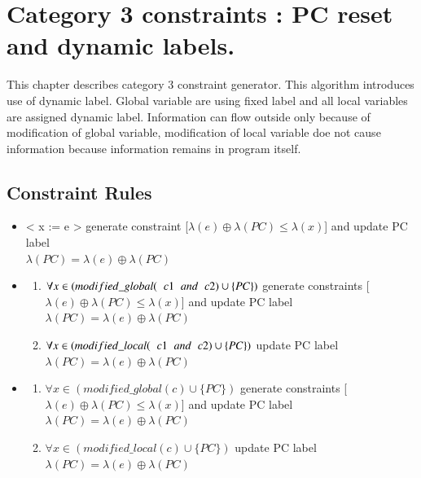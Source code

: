 \section{Category 3 constraints : PC reset and dynamic labels.}
\label{ch:c3}
This chapter describes category 3 constraint generator. This algorithm introduces use of dynamic label. Global variable are using fixed label and all local variables are assigned dynamic label. Information can flow outside only because of modification of global variable, modification of local variable doe not cause information because information remains in program itself.   
\subsection{Constraint Rules}
\begin{itemize}
	\item < x := e > generate constraint [$\lambda(e)\oplus\lambda(PC)\le\lambda(x)$] and update PC label\\ $\lambda(PC) = \lambda(e)\oplus\lambda(PC)$ 
	\item < if e then c1 else c2> \begin{enumerate}
		\item $\forall  x \in ( modified\_global(\hspace{0.2cm} c1 \hspace{0.2cm}and \hspace{0.2cm} c2) \cup \{PC\} )$ generate constraints [$\lambda(e)\oplus\lambda(PC)\le\lambda(x)$] and update PC label $\lambda(PC) = \lambda(e)\oplus\lambda(PC)$
		\item $\forall x \in ( modified\_local(\hspace{0.2cm} c1 \hspace{0.2cm}and \hspace{0.2cm} c2) \cup \{PC\} )$ update PC label $\lambda(PC) = \lambda(e)\oplus\lambda(PC)$
	\end{enumerate}
	\item < while e do c > \begin{enumerate}
		\item $\forall  x \in ( modified\_global(c) \cup \{PC\} )$ generate constraints [$\lambda(e)\oplus\lambda(PC)\le\lambda(x)$] and update PC label $\lambda(PC) = \lambda(e)\oplus\lambda(PC)$
		\item $\forall x \in ( modified\_local(c) \cup \{PC\} )$ update PC label $\lambda(PC) = \lambda(e)\oplus\lambda(PC)$
	\end{enumerate}
\end{itemize} 
